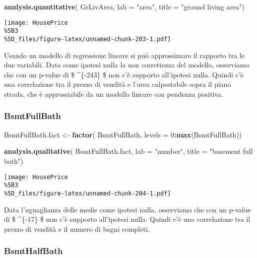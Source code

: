 \documentclass[
]{article}
\newenvironment{Shaded}{\begin{snugshade}}{\end{snugshade}}
\newcommand{\AttributeTok}[1]{\textcolor[rgb]{0.13,0.29,0.53}{#1}}
\newcommand{\DecValTok}[1]{\textcolor[rgb]{0.00,0.00,0.81}{#1}}
\newcommand{\FunctionTok}[1]{\textcolor[rgb]{0.13,0.29,0.53}{\textbf{#1}}}
\newcommand{\NormalTok}[1]{#1}
\newcommand{\OtherTok}[1]{\textcolor[rgb]{0.56,0.35,0.01}{#1}}
\newcommand{\SpecialCharTok}[1]{\textcolor[rgb]{0.81,0.36,0.00}{\textbf{#1}}}
\newcommand{\StringTok}[1]{\textcolor[rgb]{0.31,0.60,0.02}{#1}}
\begin{document}
\begin{Shaded}
\begin{Highlighting}[]
\FunctionTok{analysis.quantitative}\NormalTok{(}
\NormalTok{    GrLivArea,}
    \AttributeTok{lab =} \StringTok{"area"}\NormalTok{,}
    \AttributeTok{title =} \StringTok{"ground living area"}\NormalTok{)}
\end{Highlighting}
\end{Shaded}

\texttt{[image: HousePrice\\\%5B3\\\%5D\_files/figure-latex/unnamed-chunk-203-1.pdf]}

Usando un modello di regressione lineare si può approssimare il rapporto
tra le due variabili. Data come ipotesi nulla la non correttezza del
modello, osserviamo che con un p-value di \$ \^{}\{-243\} \$
non c'è supporto all'ipotesi nulla. Quindi c'è una correlazione tra il
prezzo di vendità e l'area calpestabile sopra il piano strada, che è
approssiabile da un modello lineare con pendenza positiva.

\subsubsection{BsmtFullBath}\label{bsmtfullbath-1}

\begin{Shaded}
\begin{Highlighting}[]
\NormalTok{BsmtFullBath.fact }\OtherTok{\textless{}{-}} \FunctionTok{factor}\NormalTok{(}
\NormalTok{    BsmtFullBath,}
    \AttributeTok{levels =} \DecValTok{0}\SpecialCharTok{:}\FunctionTok{max}\NormalTok{(BsmtFullBath))}

\FunctionTok{analysis.qualitative}\NormalTok{(}
\NormalTok{    BsmtFullBath.fact,}
    \AttributeTok{lab =} \StringTok{"number"}\NormalTok{,}
    \AttributeTok{title =} \StringTok{"basement full bath"}\NormalTok{)}
\end{Highlighting}
\end{Shaded}

\texttt{[image: HousePrice\\\%5B3\\\%5D\_files/figure-latex/unnamed-chunk-204-1.pdf]}

Data l'uguaglianza delle medie come ipotesi nulla, osserviamo che con un
p-value di \$ \^{}\{-17\} \$ non c'è supporto all'ipotesi
nulla. Quindi c'è una correlazione tra il prezzo di vendità e il numero
di bagni completi.

\subsubsection{BsmtHalfBath}\label{bsmthalfbath-1}
\end{document}
